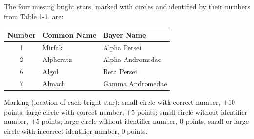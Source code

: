 The four missing bright stars, marked with circles and identified by their
numbers from Table 1-1, are:

\begin{center}
\begin{tabular}{cll}
Number & Common Name & Bayer Name \\
\hline
1 & Mirfak & Alpha Persei \\
2 & Alpheratz & Alpha Andromedae \\
6 & Algol & Beta Persei \\
7 & Almach & Gamma Andromedae \\
\end{tabular}
\end{center}


Marking (location of each bright star): small circle with correct number,
$+10$ points; large circle with correct number, $+5$ points; small circle
without identifier number, $+5$ points; large circle without identifier
number, 0 points; small or large circle with incorrect identifier number,
0 points.
